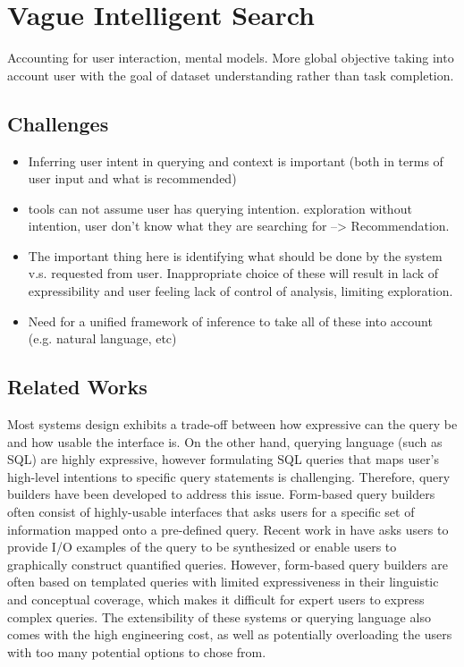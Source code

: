 \section{Vague Intelligent Search\label{sec:vague}}
Accounting for user interaction, mental models. More global objective taking into account user with the goal of dataset understanding rather than task completion.

\subsection{Challenges}
\begin{itemize}
\item Inferring user intent in querying and context is important (both in terms of user input and what is recommended)
\item tools can not assume user has querying intention. exploration without intention, user don’t know what they are searching for --> Recommendation.
\item The important thing here is identifying what should be done by the system v.s. requested from user. Inappropriate choice of these will result in lack of expressibility and user feeling lack of control of analysis, limiting exploration.
\item Need for a unified framework of inference to take all of these into account (e.g. natural language, etc)
\end{itemize}
\subsection{Related Works}

Most systems design exhibits a trade-off between how expressive can the query be and how usable the interface is. On the other hand, querying language (such as SQL) are highly expressive, however formulating SQL queries that maps user's high-level intentions to specific query statements is challenging. Therefore,  query builders have been developed to address this issue. Form-based query builders often consist of highly-usable interfaces that asks users for a specific set of information mapped onto a pre-defined query. Recent work in have asks users to provide I/O examples of the query to be synthesized\cite{Wang2017a,Wang2017,Jin2017} or enable users to graphically construct quantified queries\cite{Abouzied2012}. However, form-based query builders are often based on templated queries with limited expressiveness in their linguistic and conceptual coverage, which makes it difficult for expert users to express complex queries. The extensibility of these systems or querying language also comes with the high engineering cost, as well as potentially overloading the users with too many potential options to chose from.

